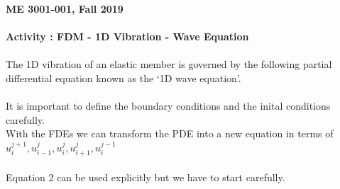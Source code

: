 \documentclass[11pt]{article}
\begin{document}
	\textbf{\LARGE ME 3001-001, Fall 2019} \\\\
	\textbf{\LARGE Activity : FDM - 1D Vibration - Wave Equation} \\\\

	The 1D vibration of an elastic member is governed by the following partial differential equation known as the `1D wave equation'. \\

	 \\

	It is important to define the boundary conditions and the inital conditions carefully. \vspace{50mm}\\


	With the FDEs we can transform the PDE into a new equation in terms of $u_i^{j+1}, u_{i-1}^{j}, u_{i}^{j},u_{i+1}^{j},u_i^{j-1}$ \vspace{30mm} \\\\
	
	Equation 2 can be used explicitly but we have to start carefully.

		


		
\end{document}
